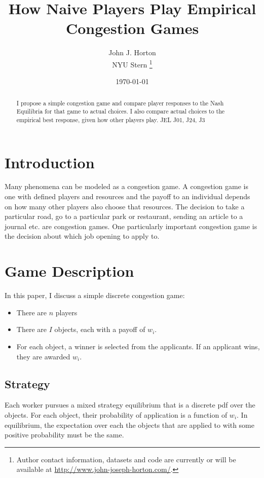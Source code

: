 \documentclass[11pt]{article}
\begin{document}
 

\title{How Naive Players Play Empirical Congestion Games} 

\date{\today}

\author{ John J. Horton \\ NYU Stern \footnote{ Author contact information, datasets and code are currently or will be available at \href{http://www.john-joseph-horton.com/}{http://www.john-joseph-horton.com/}. } }
\maketitle

\begin{abstract}
\noindent  I propose a simple congestion game and compare player responses to the Nash Equilibria for that game to actual choices. 
I also compare actual choices to the empirical best response, given how other players play.  \newline
\noindent JEL J01, J24, J3
\end{abstract} 

\section{Introduction}

Many phenomena can be modeled as a congestion game. 
A congestion game is one with defined players and resources and the payoff to an individual depends on how many other players also choose that resources. 
The decision to take a particular road, go to a particular park or restaurant, sending an article to a journal etc. are congestion games. 
One particularly important congestion game is the decision about which job opening to apply to. 

\section{Game Description} 
In this paper, I discuss a simple discrete congestion game: 

\begin{itemize}
\item There are $n$ players 
\item There are $I$ objects, each with a payoff of $w_i$. 
\item For each object, a winner is selected from the applicants. If an applicant wins, they are awarded $w_i$. 
\end{itemize} 

\subsection{Strategy} 
Each worker pursues a mixed strategy equilibrium that is a discrete pdf over the objects. 
For each object, their probability of application is a function of $w_i$. 
In equilibrium, the expectation over each the objects that are applied to with some positive probability must be the same. 
\end{document}
